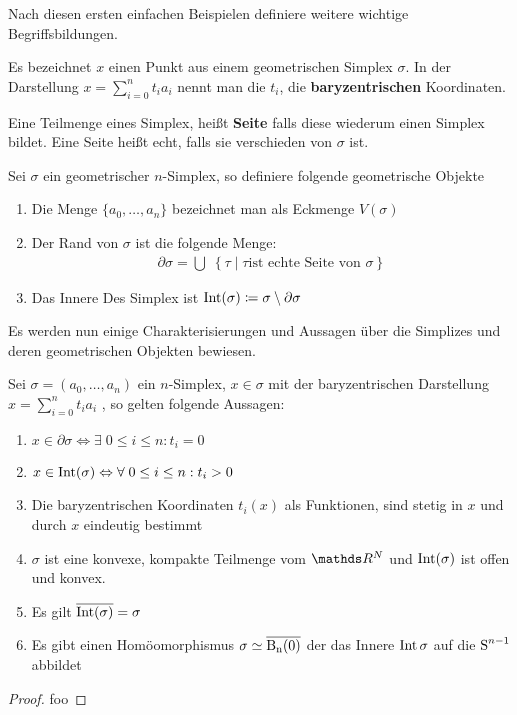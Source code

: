 Nach diesen ersten einfachen Beispielen definiere weitere wichtige
Begriffsbildungen.

\begin{Def}
  Es bezeichnet $x$ einen Punkt aus einem geometrischen Simplex
  $\sigma$. In der Darstellung $x = \sum\limits_{i=0}^n t_i a_i$ nennt
  man die $t_i$, die \textbf{baryzentrischen} Koordinaten.
	
  Eine Teilmenge eines Simplex, heißt \textbf{Seite} falls diese
  wiederum einen Simplex bildet. Eine Seite heißt echt, falls sie
  verschieden von $\sigma$ ist.
\end{Def}

\begin{Def}
  Sei $\sigma$ ein geometrischer $n$-Simplex, so definiere folgende
  geometrische Objekte
  \begin{enumerate}[{\bfseries1)}]
  \item Die Menge $\{ a_0 , \ldots , a_n \}$ bezeichnet man als
    Eckmenge $V(\sigma)$
  \item Der Rand von $\sigma$ ist die folgende Menge:
    \begin{gather*}
      \partial\sigma = \bigcup \; \left\{ \tau \; \Big| \; \tau \text{
          ist echte Seite von } \sigma \right\}
    \end{gather*}
  \item Das Innere Des Simplex ist
    $\operatorname{Int}(\sigma) \coloneqq \sigma \setminus \partial\sigma$
  \end{enumerate}
\end{Def}

Es werden nun einige Charakterisierungen und Aussagen über die
Simplizes und deren geometrischen Objekten bewiesen.

\begin{Satz}
  \upshape Sei $\sigma = (a_0 , \ldots , a_n)$ ein $n$-Simplex,
  $x \in \sigma$ mit der baryzentrischen Darstellung
  $x=\sum\limits_{i=0}^n t_i a_i$ , so gelten folgende Aussagen:
  \begin{enumerate}[1)]%
  \item
    $x \in \partial\sigma \Leftrightarrow \exists \; 0 \leq i \leq n :
    t_i = 0$
  \item
    $x \in \operatorname{Int}(\sigma) \Leftrightarrow \forall \; 0 \leq i \leq n :
    t_i > 0$
  \item Die baryzentrischen Koordinaten $t_i(x)$ als Funktionen, sind
    stetig in $x$ und durch $x$ eindeutig bestimmt
  \item $\sigma$ ist eine konvexe, kompakte Teilmenge vom $\R^N$ und
    $\operatorname{Int}(\sigma)$ ist offen und konvex.
  \item Es gilt $\overline{\operatorname{Int}(\sigma)} = \sigma$
  \item Es gibt einen Homöomorphismus $\sigma \simeq \operatorname{\overline{\operatorname{B}_n(0)}}$ der das
    Innere $\operatorname{Int}{\sigma}$ auf die $\operatorname{S}^{n-1}$ abbildet
  \end{enumerate}
  \begin{proof}
    foo
  \end{proof}
\end{Satz}


